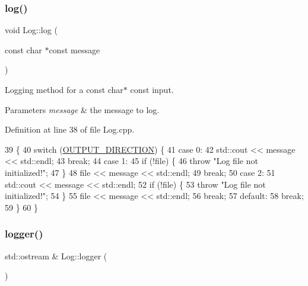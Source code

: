 \subsubsection{\texorpdfstring{log()}{log()}\hspace{0.1cm}{\footnotesize\ttfamily [2/2]}}
{\footnotesize\ttfamily void Log\+::log (\begin{DoxyParamCaption}\item[{const char $\ast$const}]{message }\end{DoxyParamCaption})}

Logging method for a const char$\ast$ const input. 
\begin{DoxyParams}{Parameters}
{\em message} & the message to log. \\
\hline
\end{DoxyParams}


Definition at line 38 of file Log.\+cpp.


\begin{DoxyCode}
39 \{
40   \textcolor{keywordflow}{switch} (\mbox{\hyperlink{classLog_a8928d01e0edbf98838c642e04e12458e}{OUTPUT\_DIRECTION}}) \{
41   \textcolor{keywordflow}{case} 0:
42     std::cout << message << std::endl;
43     \textcolor{keywordflow}{break};
44   \textcolor{keywordflow}{case} 1:
45     \textcolor{keywordflow}{if} (!file) \{
46       \textcolor{keywordflow}{throw} \textcolor{stringliteral}{"Log file not initialized!"};
47     \}
48     file << message << std::endl;
49     \textcolor{keywordflow}{break};
50   \textcolor{keywordflow}{case} 2:
51     std::cout << message << std::endl;
52     \textcolor{keywordflow}{if} (!file) \{
53       \textcolor{keywordflow}{throw} \textcolor{stringliteral}{"Log file not initialized!"};
54     \}
55     file << message << std::endl;
56     \textcolor{keywordflow}{break};
57   \textcolor{keywordflow}{default}:
58     \textcolor{keywordflow}{break};
59   \}
60 \}
\end{DoxyCode}
\mbox{\label{classLog_a32d048a4924c7851c4b7b16758675af6}} 
\subsubsection{\texorpdfstring{logger()}{logger()}}
{\footnotesize\ttfamily std\+::ostream \& Log\+::logger (\begin{DoxyParamCaption}{ }\end{DoxyParamCaption})}

